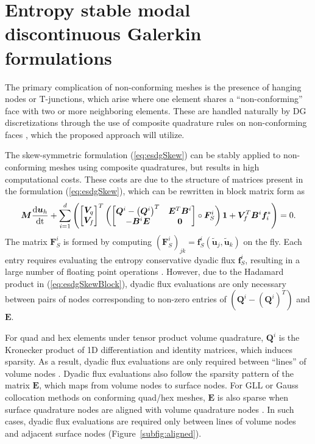 \documentclass[review]{siamart0216}
\renewcommand{\tilde}{\widetilde}
\newcommand{\td}[2]{\frac{{\rm d}#1}{{\rm d}{\rm #2}}}
\newcommand{\LRp}[1]{\left( #1 \right)}
\begin{document}
\section{Entropy stable modal discontinuous Galerkin formulations}

The primary complication of non-conforming meshes is the presence of hanging nodes or T-junctions, which arise where one element shares a ``non-conforming'' face with two or more neighboring elements.  These are handled naturally by DG discretizations through the use of composite quadrature rules on non-conforming faces \cite{bui2012analysis, Kozdon2018}, which the proposed approach will utilize.  

The skew-symmetric formulation (\ref{eq:esdgSkew}) can be stably applied to non-conforming meshes using composite quadratures, but results in high computational costs.  These costs are due to the structure of matrices present in the formulation (\ref{eq:esdgSkew}), which can be rewritten in block matrix form as
\begin{equation}
\bm{M}\td{\bm{u}_h}{t} + \sum_{i=1}^d\LRp{\begin{bmatrix} \bm{V}_q \\ \bm{V}_f \end{bmatrix}^T
\LRp{\begin{bmatrix}
\bm{Q}^i-\LRp{\bm{Q}^i}^T & \bm{E}^T\bm{B}^i\\
-\bm{B}^i\bm{E} & \bm{0}
\end{bmatrix} \circ \bm{F}^i_S}\bm{1} + \bm{V}_f^T\bm{B}^i\bm{f}_i^*} = 0.  
\label{eq:esdgSkewBlock}
\end{equation}
The matrix $\bm{F}^i_S$ is formed by computing $\LRp{\bm{F}^i_S}_{jk} = \bm{f}^i_S\LRp{\tilde{\bm{u}}_j,\tilde{\bm{u}}_k}$ on the fly.  Each entry requires evaluating the entropy conservative dyadic flux $\bm{f}^i_S$, resulting in a large number of floating point operations \cite{wintermeyer2018entropy}.  However, due to the Hadamard product in (\ref{eq:esdgSkewBlock}), dyadic flux evaluations are only necessary between pairs of nodes corresponding to non-zero entries of  $\LRp{\bm{Q}^i-(\bm{Q}^i)^T}$ and $\bm{E}$.  

For quad and hex elements under tensor product volume quadrature, $\bm{Q}^i$ is the Kronecker product of 1D differentiation and identity matrices, which induces sparsity.  As a result, dyadic flux evaluations are only required between ``lines'' of volume nodes \cite{carpenter2014entropy, chan2018efficient}.  Dyadic flux evaluations also follow the sparsity pattern of the matrix $\bm{E}$, which maps from volume nodes to surface nodes.  For GLL or Gauss collocation methods on conforming quad/hex meshes, $\bm{E}$ is also sparse when surface quadrature nodes are aligned with volume quadrature nodes \cite{chan2018efficient}.  In such cases, dyadic flux evaluations are required only between lines of volume nodes and adjacent surface nodes  (Figure~\ref{subfig:aligned}).  
\end{document}
